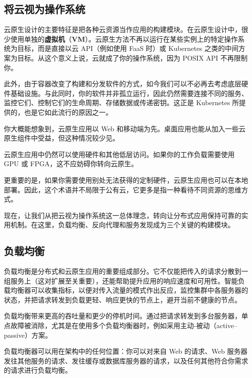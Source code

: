 \subsection{将云视为操作系统}

\label{idx:1927}
\label{idx:1928}
云原生设计的主要特征是把各种云资源当作应用的构建模块。在云原生设计中，很少使用单独的\textbf{虚拟机}（\textbf{VM}）。云原生方法不再以运行在某些实例上的特定操作系统为目标，而是直接以云 API（例如使用 FaaS 时）或 Kubernetes 之类的中间方案为目标。从这个意义上说，云就成了你的操作系统，因为 POSIX API 不再限制你。

此外，由于容器改变了构建和分发软件的方式，如今我们可以不必再去考虑底层硬件基础设施。与此同时，你的软件并非孤立运行，因此仍然需要连接不同的服务、监控它们、控制它们的生命周期、存储数据或传递密钥。这正是 Kubernetes 所提供的，也是它如此流行的原因之一。

你大概能想象到，云原生应用以 Web 和移动端为先。桌面应用也能从加入一些云原生组件中受益，但这种情况较少见。

云原生应用中仍然可以使用硬件和其他低层访问。如果你的工作负载需要使用 GPU 或 FPGA，这不应妨碍你转向云原生。

更重要的是，如果你需要使用别处无法获得的定制硬件，云原生应用也可以在本地部署。因此，这个术语并不局限于公有云，它更多是指一种看待不同资源的思维方式。

\label{idx:1929}
现在，让我们从把云视为操作系统这一总体理念，转向让分布式应用保持可靠的实用机制。在这里，负载均衡、反向代理和服务发现成为三个关键的构建模块。

\subsection{负载均衡}

\label{idx:1930}
负载均衡是分布式和云原生应用的重要组成部分。它不仅能把传入的请求分散到一组服务上（这对扩展至关重要），还能帮助提升应用的响应速度和可用性。智能负载均衡器可以收集指标，以便对传入流量的模式作出反应，监控集群中各服务器的状态，并把请求转发到负载更轻、响应更快的节点上，避开当前不健康的节点。


负载均衡带来更高的吞吐量和更少的停机时间。通过把请求转发到多台服务器，单点故障被消除，尤其是在使用多个负载均衡器时，例如采用主动-被动（active–passive）方案。

负载均衡器可以用在架构中的任何位置：你可以对来自 Web 的请求、Web 服务器发往其他服务的请求、发往缓存或数据库服务器的请求，以及任何其他符合你需求的请求进行负载均衡。

